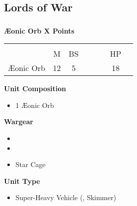 \subsection{Lords of War}

\newpage
\subsubsection[Æonic Orb]{}
\hspace{0.5em}
\begin{minipage}[t]{0.72\textwidth}
	{\large \textbf{Æonic Orb \dotfill X Points}}
	\begin{NiceTabular}{m{145 pt} *{2}{c} | *{3}{c} | c | c }
		& & &  & & & &  \\
		& M & BS &  &  &  & HP &  \\
		\hline
		Æonic Orb & 12 & 5 &  &  &  & 18 & \\
	\end{NiceTabular}
	\small
	\begin{minipage}[t]{0.5\textwidth}
		\begin{flushleft}
			\vspace*{2em}
			\textbf{Unit Composition}
			\begin{itemize}
				\item 1 Æonic Orb
			\end{itemize}
			
			\textbf{Wargear}
			\begin{itemize}
				\item {}
				\item {}
				\item Star Cage
			\end{itemize}
		\end{flushleft}
	\end{minipage}
	\begin{minipage}[t]{0.5\textwidth}
		\begin{flushleft}
			\vspace*{2em}
			\textbf{Unit Type}
			\begin{itemize}
				\item Super-Heavy Vehicle (\quickref{Living Metal}, Skimmer)
			\end{itemize}
			

\end{flushleft}
\end{minipage}
\end{minipage}
